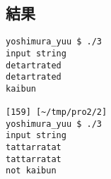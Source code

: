 \documentclass[11pt,a4paper,a4j]{jsarticle}
\begin{document}
\subsection{結果}
\begin{shadebox}
\begin{verbatim}
yoshimura_yuu $ ./3
input string
detartrated
detartrated
kaibun

[159] [~/tmp/pro2/2]
yoshimura_yuu $ ./3
input string
tattarratat
tattarratat
not kaibun
\end{verbatim}
\end{shadebox}
\clearpage
\end{document}
